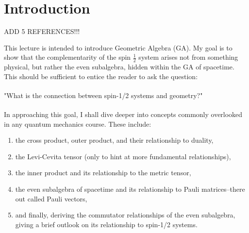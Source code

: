 \section{Introduction}

ADD 5 REFERENCES!!!

This lecture is intended to introduce Geometric Algebra (GA). My goal is to show that the complementarity of the spin $\frac{1}{2}$ system arises not from something physical, but rather the even subalgebra, hidden within the GA of spacetime. This should be sufficient to entice the reader to ask the question: 
\\ \\
"What is the connection between spin-1/2 systems and geometry?"
\\ \\
In approaching this goal, I shall dive deeper into concepts commonly overlooked in any quantum mechanics course. These include:
\begin{enumerate}
    \item the cross product, outer product, and their relationship to duality,
    \item the Levi-Cevita tensor (only to hint at more fundamental relationships),
    \item the inner product and its relationship to the metric tensor,
    \item the even subalgebra of spacetime and its relationship to Pauli matrices--there out called Pauli vectors,
    \item and finally, deriving the commutator relationships of the even subalgebra, giving a brief outlook on its relationship to spin-1/2 systems.
\end{enumerate}

